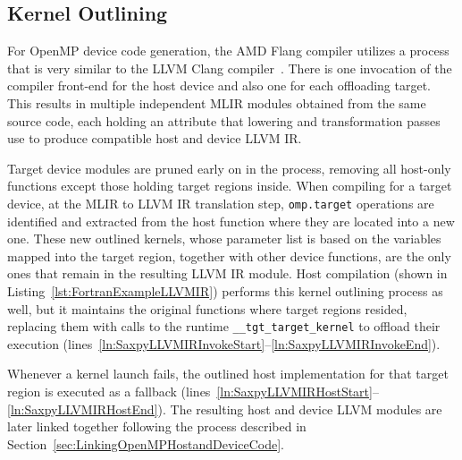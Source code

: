 \documentclass[acmtog,natbib=false]{acmart}
\newcommand{\code}[1]{\texttt{#1}\xspace}
\begin{document}
\subsection{Kernel Outlining}
\label{sec:KernelOutlining}

For OpenMP device code generation, the AMD Flang compiler utilizes a process that is very similar to the LLVM Clang compiler~\cite{antao2016offloading}.
There is one invocation of the compiler front-end for the host device and also one for each offloading target.
This results in multiple independent \ac{MLIR} modules obtained from the same source code, each holding an attribute that lowering and transformation passes use to produce compatible host and device LLVM \ac{IR}.

Target device modules are pruned early on in the process, removing all host-only functions except those holding target regions inside.
When compiling for a target device, at the \ac{MLIR} to LLVM \ac{IR} translation step, \code{omp.target} operations are identified and extracted from the host function where they are located into a new one.
These new outlined kernels, whose parameter list is based on the variables mapped into the target region, together with other device functions, are the only ones that remain in the resulting LLVM \ac{IR} module.
Host compilation (shown in Listing~\ref{lst:FortranExampleLLVMIR}) performs this kernel outlining process as well, but it maintains the original functions where target regions resided, replacing them with calls to the runtime \code{\_\_tgt\_target\_kernel} to offload their execution (lines~\ref{ln:SaxpyLLVMIRInvokeStart}--\ref{ln:SaxpyLLVMIRInvokeEnd}).

Whenever a kernel launch fails, the outlined host implementation for that target region is executed as a fallback (lines~\ref{ln:SaxpyLLVMIRHostStart}--\ref{ln:SaxpyLLVMIRHostEnd}).
The resulting host and device LLVM modules are later linked together following the process described in Section~\ref{sec:LinkingOpenMPHostandDeviceCode}.
 
\end{document}
